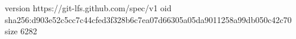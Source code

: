 version https://git-lfs.github.com/spec/v1
oid sha256:d903e52c5cc7c44cfed3f328b6c7ea07d66305a05da9011258a99db050c42c70
size 6282
